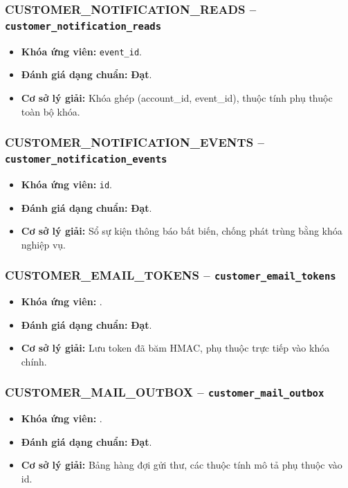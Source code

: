 \subsubsection{CUSTOMER_NOTIFICATION_READS -- \texttt{customer\_notification\_reads}}
\begin{itemize}
  \item \textbf{Khóa ứng viên:} \texttt{event\_id}.
  \item \textbf{Đánh giá dạng chuẩn:} \textbf{Đạt}.
  \item \textbf{Cơ sở lý giải:} Khóa ghép (account_id, event_id), thuộc tính phụ thuộc toàn bộ khóa.
\end{itemize}

\subsubsection{CUSTOMER_NOTIFICATION_EVENTS -- \texttt{customer\_notification\_events}}
\begin{itemize}
  \item \textbf{Khóa ứng viên:} \texttt{id}.
  \item \textbf{Đánh giá dạng chuẩn:} \textbf{Đạt}.
  \item \textbf{Cơ sở lý giải:} Sổ sự kiện thông báo bất biến, chống phát trùng bằng khóa nghiệp vụ.
\end{itemize}

\subsubsection{CUSTOMER_EMAIL_TOKENS -- \texttt{customer\_email\_tokens}}
\begin{itemize}
  \item \textbf{Khóa ứng viên:} \texttt{}.
  \item \textbf{Đánh giá dạng chuẩn:} \textbf{Đạt}.
  \item \textbf{Cơ sở lý giải:} Lưu token đã băm HMAC, phụ thuộc trực tiếp vào khóa chính.
\end{itemize}

\subsubsection{CUSTOMER_MAIL_OUTBOX -- \texttt{customer\_mail\_outbox}}
\begin{itemize}
  \item \textbf{Khóa ứng viên:} \texttt{}.
  \item \textbf{Đánh giá dạng chuẩn:} \textbf{Đạt}.
  \item \textbf{Cơ sở lý giải:} Bảng hàng đợi gửi thư, các thuộc tính mô tả phụ thuộc vào id.
\end{itemize}

